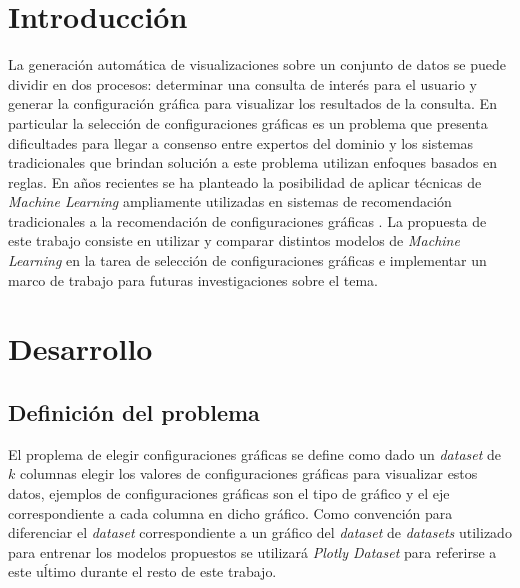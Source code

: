 \documentclass[a4paper,10pt,twocolumn]{article}
\begin{document}

\section{Introducción}\label{sec:intro}
 
La generación automática de visualizaciones sobre un conjunto de
    datos se puede dividir en dos procesos: determinar una consulta de interés
    para el usuario y generar la configuración gráfica para visualizar los resultados de la
    consulta. En particular la selección de configuraciones gráficas es un problema que
    presenta dificultades para llegar a consenso entre expertos del dominio y los sistemas
    tradicionales que brindan solución a este problema utilizan enfoques basados en reglas.
    En años recientes se ha planteado la posibilidad de aplicar técnicas de \textit{Machine Learning}
    ampliamente utilizadas en sistemas de recomendación tradicionales a la recomendación de configuraciones
    gráficas \cite{hu2019vizml} \cite{li2021kg4vis}. La propuesta de este trabajo consiste en utilizar y comparar distintos modelos
    de \textit{Machine Learning} en la tarea de selección de configuraciones gráficas e implementar un marco de trabajo
	para futuras investigaciones sobre el tema.




\section{Desarrollo}\label{sec:dev}
 
	\subsection{Definici\'on del problema}
	El proplema de elegir configuraciones gr\'aficas se define como dado un \textit{dataset} de 
	$k$ columnas elegir los valores de configuraciones gr\'aficas para visualizar estos datos, ejemplos de configuraciones gr\'aficas son el tipo de gr\'afico
	y el eje correspondiente a cada columna en dicho gr\'afico. Como convenci\'on para diferenciar el \textit{dataset} correspondiente
	a un gr\'afico del \textit{dataset} de \textit{datasets} utilizado para entrenar los modelos propuestos se utilizar\'a \textit{Plotly Dataset}
	para referirse a este u\'ltimo durante el resto de este trabajo.
\end{document}
